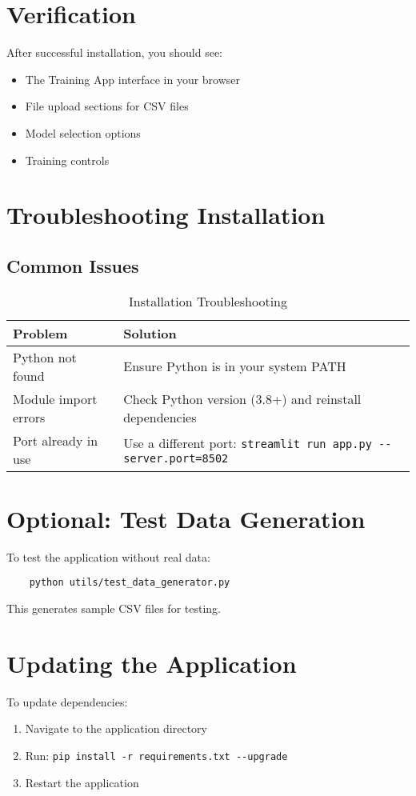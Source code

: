 \section{Verification}

After successful installation, you should see:
\begin{itemize}
	\item The Training App interface in your browser
	\item File upload sections for CSV files
	\item Model selection options
	\item Training controls
\end{itemize}

\section{Troubleshooting Installation}

\subsection{Common Issues}

\begin{table}[h]
	\centering
	\begin{tabular}{|p{}|p{}|}
		\hline
		\textbf{Problem} & \textbf{Solution} \\
		\hline
		Python not found & Ensure Python is in your system PATH \\
		\hline
		Module import errors & Check Python version (3.8+) and reinstall dependencies \\
		\hline
		Port already in use & Use a different port: \verb|streamlit run app.py --server.port=8502| \\
		\hline
	\end{tabular}
	\caption{Installation Troubleshooting}
\end{table}

\section{Optional: Test Data Generation}

To test the application without real data:
\begin{verbatim}
	python utils/test_data_generator.py
\end{verbatim}

This generates sample CSV files for testing.

\section{Updating the Application}

To update dependencies:
\begin{enumerate}
	\item Navigate to the application directory
	\item Run: \verb|pip install -r requirements.txt --upgrade|
	\item Restart the application
\end{enumerate}